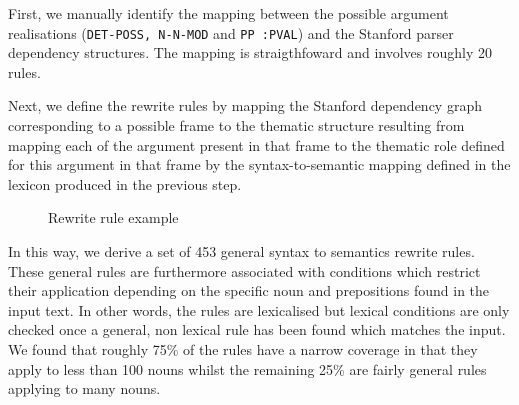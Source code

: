 \documentclass[twocolumn,10pt]{article}
\begin{document}
First, we manually identify the mapping between the possible argument
realisations (\verb!DET-POSS, N-N-MOD! and \verb!PP :PVAL!) and the
Stanford parser dependency structures. %
The mapping is straigthfoward and involves roughly 20
rules.

Next, we define the rewrite rules by mapping the Stanford dependency
graph corresponding to a possible frame to the thematic structure
resulting from mapping each of the argument present in that frame to
the thematic role defined for this argument in that frame by the
syntax-to-semantic mapping defined in the lexicon produced in the
previous step.

\begin{figure}
\begin{center}
\end{center}
\caption{Rewrite rule example \label{rrnnp}}
\end{figure}

In this way, we derive a set of 453 general syntax to semantics
rewrite rules. These general rules are furthermore associated with
conditions which restrict their application depending on the specific
noun and prepositions found in the input text. In other words, the
rules are lexicalised but lexical conditions are only checked once a
general, non lexical rule has been found which matches the input. We
found that roughly 75\% of the rules have a narrow coverage in that
they apply to less than 100 nouns whilst the remaining 25\% are fairly
general rules applying to many nouns.



\end{document}
